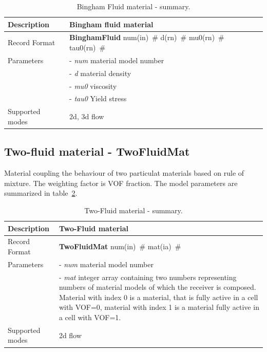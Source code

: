 \documentclass[a4paper]{article}
\newcommand{\descitem}[1]{{\noindent \bf #1}}
\newcommand{\elemparam}[2]{{{#1\tiny (#2)}~\#}}
\newcommand{\param}[1]{{\it #1}}
\begin{document}
\begin{table}[!htb]
\begin{tabular}{|l|p{9cm}|}
\hline
Description & Bingham fluid material\\
\hline
Record Format & \descitem{BinghamFluid} \elemparam{num}{in}
\elemparam{d}{rn} \elemparam{mu0}{rn} \elemparam{tau0}{rn}\\
Parameters &- \param{num} material model number\\
&- \param{d} material density\\
&- \param{mu0} viscosity\\
&- \param{tau0} Yield stress\\
Supported modes& 2d, 3d flow\\
\hline
\end{tabular}
\caption{Bingham Fluid material - summary.}
\label{BinghamFluidMaterial_table}
\end{table}



\subsection{Two-fluid material - TwoFluidMat}
\label{TwoFluidMaterial}
Material coupling the behaviour of two particulat materials based on
rule of mixture. The weighting factor is VOF fraction.
The model parameters are summarized in table~\ref{TwoFluidMaterial_table}.

\begin{table}[!htb]
\begin{tabular}{|l|p{9cm}|}
\hline
Description & Two-Fluid material\\
\hline
Record Format & \descitem{TwoFluidMat} \elemparam{num}{in}
\elemparam{mat}{ia}\\
Parameters &- \param{num} material model number\\
&- \param{mat} integer array containing two numbers representing
numbers of material models of which the receiver is composed. Material
with index 0 is a material, that is fully active in a cell with VOF=0,
material with index 1 is a material fully active in a cell with VOF=1.\\
Supported modes& 2d flow\\
\hline
\end{tabular}
\caption{Two-Fluid material - summary.}
\label{TwoFluidMaterial_table}
\end{table}
\end{document}

